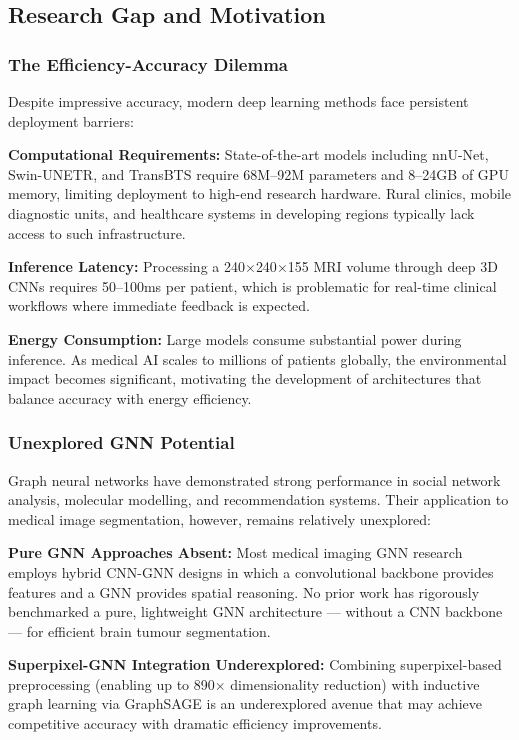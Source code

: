 \subsection{Research Gap and Motivation}

\subsubsection{The Efficiency-Accuracy Dilemma}

Despite impressive accuracy, modern deep learning methods face persistent deployment barriers:

\textbf{Computational Requirements:} State-of-the-art models including nnU-Net, Swin-UNETR, and TransBTS require 68M--92M parameters and 8--24GB of GPU memory, limiting deployment to high-end research hardware. Rural clinics, mobile diagnostic units, and healthcare systems in developing regions typically lack access to such infrastructure.

\textbf{Inference Latency:} Processing a 240$\times$240$\times$155 MRI volume through deep 3D CNNs requires 50--100ms per patient, which is problematic for real-time clinical workflows where immediate feedback is expected.

\textbf{Energy Consumption:} Large models consume substantial power during inference. As medical AI scales to millions of patients globally, the environmental impact becomes significant, motivating the development of architectures that balance accuracy with energy efficiency.

\subsubsection{Unexplored GNN Potential}

Graph neural networks have demonstrated strong performance in social network analysis, molecular modelling, and recommendation systems. Their application to medical image segmentation, however, remains relatively unexplored:

\textbf{Pure GNN Approaches Absent:} Most medical imaging GNN research employs hybrid CNN-GNN designs in which a convolutional backbone provides features and a GNN provides spatial reasoning. No prior work has rigorously benchmarked a pure, lightweight GNN architecture — without a CNN backbone — for efficient brain tumour segmentation.

\textbf{Superpixel-GNN Integration Underexplored:} Combining superpixel-based preprocessing (enabling up to 890$\times$ dimensionality reduction) with inductive graph learning via GraphSAGE is an underexplored avenue that may achieve competitive accuracy with dramatic efficiency improvements.

